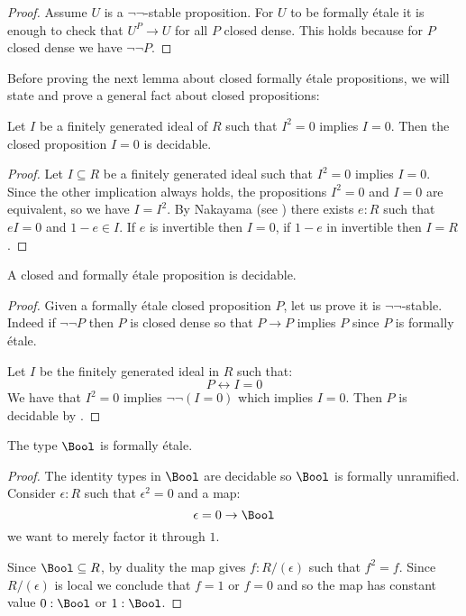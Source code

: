 \begin{proof}
  Assume $U$ is a $\neg\neg$-stable proposition. For $U$ to be formally étale it is enough to check that $U^P\to U$ for all $P$ closed dense. This holds because for $P$ closed dense we have $\neg\neg P$.
  \end{proof}

Before proving the next lemma about closed formally étale propositions,
we will state and prove a general fact about closed propositions:

\begin{lemma}
  \label{square-zero-implies-zero-decidable}
  Let $I$ be a finitely generated ideal of $R$ such that $I^2=0$ implies $I=0$.
  Then the closed proposition $I=0$ is decidable.
\end{lemma}

\begin{proof}
  Let $I\subseteq R$ be a finitely generated ideal such that $I^2=0$ implies $I=0$.
  Since the other implication always holds, the propositions $I^2=0$ and $I=0$ are equivalent, so we have $I=I^2$.
  By Nakayama (see \cite[Lemma II.4.6]{lombardi-quitte}) there exists $e:R$ such that $eI = 0$ and $1-e\in I$.
  If $e$ is invertible then $I=0$, if $1-e$ in invertible then $I=R$.
\end{proof}

\begin{lemma}\label{closed-and-etale-decidable}
A closed and formally étale proposition is decidable.
\end{lemma} 

\begin{proof}
Given a formally étale closed proposition $P$, let us prove it is $\neg\neg$-stable. Indeed if $\neg\neg P$ then $P$ is closed dense so that $P\to P$ implies $P$ since $P$ is formally étale. 

Let $I$ be the finitely generated ideal in $R$ such that:
\[P\leftrightarrow I=0\]
We have that $I^2=0$ implies $\neg\neg (I=0)$ which implies $I=0$.
Then $P$ is decidable by . 
\end{proof}

\begin{proposition}\label{bool-is-etale}
  The type $\Bool$ is formally étale.
\end{proposition}

\begin{proof}
The identity types in $\Bool$ are decidable so $\Bool$ is formally unramified. Consider $\epsilon:R$ such that $\epsilon^2=0$ and a map:
\[\epsilon=0 \to \Bool\]
we want to merely factor it through $1$.

 Since $\Bool\subseteq R$, by duality the map gives $f:R/(\epsilon)$ such that $f^2=f$. Since $R/(\epsilon)$ is local we conclude that $f = 1$ or $f=0$ and so the map has constant value $0:\Bool$ or $1:\Bool$.
\end{proof}

